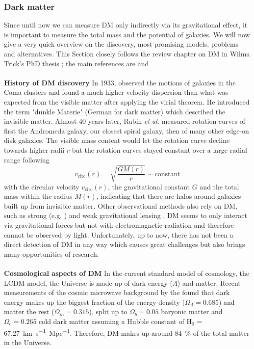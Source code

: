 \subsubsection{Dark matter}
Since until now we can measure \ac{DM} only indirectly via its gravitational effect, it is important to measure the total mass and the potential of galaxies. We will now give a very quick overview on the discovery, most promising models, problems and alternatives. This Section closely follows the review chapter on \ac{DM} in Wilma Trick's PhD thesis \citep{Wilmathesis}; the main references are \citet{Ostriker...DM...2003, Maoz...astrophysics...2007} and \citet{Mo...galformev...2010} \\
\\\textbf{History of \ac{DM} discovery} In 1933, \citeauthor{Zwicky...DM...1933} observed the motions of galaxies in the Coma clusters and found a much higher velocity dispersion than what was expected from the visible matter after applying the virial theorem. He introduced the term "dunkle Materie" (German for dark matter) which described the invisible matter. Almost 40 years later, Rubin \textit{et al.} \citeyearpar{Rubin...DM...1970, Rubin...DM...1978, Rubin...DM...1980} measured rotation curves of first the Andromeda galaxy, our closest spiral galaxy, then of many other edge-on disk galaxies. The visible mass content would let the rotation curve decline towards higher radii $r$ but the rotation curves stayed constant over a large radial range following 
\begin{equation}\label{eq:circ_vel}
    v_{\mathrm{circ}}(r) = \sqrt{\frac{GM(r)}{r}} \sim \mathrm{constant}
\end{equation}
with the circular velocity $v_\mathrm{{circ}}(r)$, the gravitational constant $G$ and the total mass within the radius $M(r)$, indicating that there are halos around galaxies built up from invisible matter. Other observational methods also rely on \ac{DM}, such as strong (e.g. \cite{Trick..stronglensing...2016}) and weak gravitational lensing \citep{Tyson...weaklensing...1990, Kaiser...weaklensing...1993}. \ac{DM} seems to only interact via gravitational forces but not with electromagnetic radiation and therefore cannot be observed by light. Unfortunately, up to now, there has not been a direct detection of \ac{DM} in any way which causes great challenges but also brings many opportunities of research.\\
\\\textbf{Cosmological aspects of \ac{DM}}
In the current standard model of cosmology, the \ac{LCDM}-model, the Universe is made up of dark energy ($\Lambda$) and matter. Recent measurements of the cosmic microwave background by the \citet{Planck...CMB...2018} found that dark energy makes up the biggest fraction of the energy density ($\Omega_\Lambda = 0.685$) and matter the rest ($\Omega_m = 0.315$), split up to $\Omega_b = 0.05$ baryonic matter and $\Omega_c = 0.265$ cold dark matter assuming a Hubble constant of H$_0$ =  \SI{67.27}{km.s^{-1}.Mpc^{-1}}. Therefore, \ac{DM} makes up around \SI{84}{\%} of the total matter in the Universe. \\

